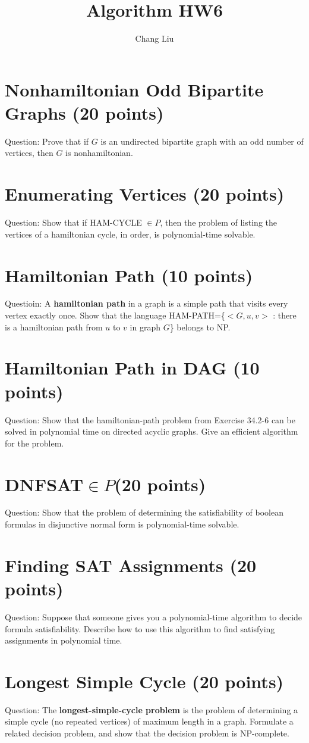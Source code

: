 \documentclass{article}
\author{Chang Liu}
\title{Algorithm HW6}
\begin{document}

\pagestyle{main}

\section{Nonhamiltonian Odd Bipartite Graphs (20 points)}
Question: Prove that if $G$ is an undirected bipartite graph with an odd number of vertices, then $G$ is nonhamiltonian.


\section{Enumerating Vertices (20 points)}
Question: Show that if HAM-CYCLE $\in{P}$, then the problem of listing the vertices of a hamiltonian cycle, in order, is polynomial-time solvable.

\section{Hamiltonian Path (10 points)}
Questioin: A \textbf{hamiltonian path} in a graph is a simple path that visits every vertex exactly once. Show that the language HAM-PATH=\{$<G,u,v>$ : there is a hamiltonian path from $u$ to $v$ in graph $G$\} belongs to NP.



\section{Hamiltonian Path in DAG (10 points)}
Question: Show that the hamiltonian-path problem from Exercise 34.2-6 can be solved in polynomial time on directed acyclic graphs. Give an efficient algorithm for the problem.



\section{DNF\-SAT$\in{P}$(20 points)}
Question: Show that the problem of determining the satisfiability of boolean formulas in disjunctive normal form is polynomial-time solvable.


\section{Finding SAT Assignments (20 points)}
Question: Suppose that someone gives you a polynomial-time algorithm to decide formula satisfiability. Describe how to use this algorithm to find satisfying assignments in polynomial time.


\section{Longest Simple Cycle (20 points)}
Question: The \textbf{longest-simple-cycle problem} is the problem of determining a simple cycle (no repeated vertices) of maximum length in a graph. Formulate a related decision problem, and show that the decision problem is NP-complete.
\end{document}
